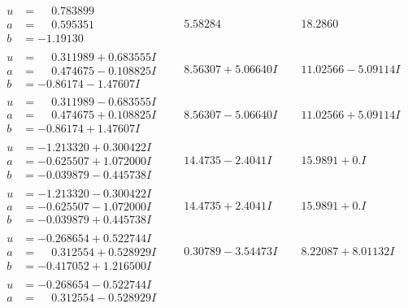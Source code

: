 \documentclass[1p]{elsarticle_modified}
\theoremstyle{definition}
\begin{document}
$$\begin{array}{c|c|c}
\begin{aligned}
u &= \phantom{-}0.783899\phantom{ +0.000000I} \\
a &= \phantom{-}0.595351\phantom{ +0.000000I} \\
b &= -1.19130\phantom{ +0.000000I}\end{aligned}
 & \phantom{-}5.58284\phantom{ +0.000000I} & \phantom{-}18.2860\phantom{ +0.000000I} \\ \hline\begin{aligned}
u &= \phantom{-}0.311989 + 0.683555 I \\
a &= \phantom{-}0.474675 - 0.108825 I \\
b &= -0.86174 - 1.47607 I\end{aligned}
 & \phantom{-}8.56307 + 5.06640 I & \phantom{-}11.02566 - 5.09114 I \\ \hline\begin{aligned}
u &= \phantom{-}0.311989 - 0.683555 I \\
a &= \phantom{-}0.474675 + 0.108825 I \\
b &= -0.86174 + 1.47607 I\end{aligned}
 & \phantom{-}8.56307 - 5.06640 I & \phantom{-}11.02566 + 5.09114 I \\ \hline\begin{aligned}
u &= -1.213320 + 0.300422 I \\
a &= -0.625507 + 1.072000 I \\
b &= -0.039879 - 0.445738 I\end{aligned}
 & \phantom{-}14.4735 - 2.4041 I & \phantom{-}15.9891 + 0. I\phantom{ +0.000000I} \\ \hline\begin{aligned}
u &= -1.213320 - 0.300422 I \\
a &= -0.625507 - 1.072000 I \\
b &= -0.039879 + 0.445738 I\end{aligned}
 & \phantom{-}14.4735 + 2.4041 I & \phantom{-}15.9891 + 0. I\phantom{ +0.000000I} \\ \hline\begin{aligned}
u &= -0.268654 + 0.522744 I \\
a &= \phantom{-}0.312554 + 0.528929 I \\
b &= -0.417052 + 1.216500 I\end{aligned}
 & \phantom{-}0.30789 - 3.54473 I & \phantom{-}8.22087 + 8.01132 I \\ \hline\begin{aligned}
u &= -0.268654 - 0.522744 I \\
a &= \phantom{-}0.312554 - 0.528929 I \\

\end{aligned}
\end{array}$$
\end{document}
